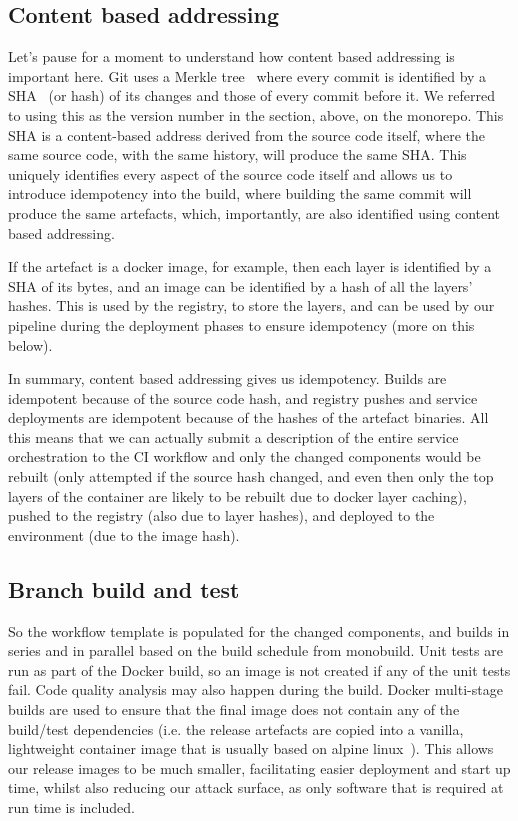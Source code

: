 \documentclass[reprint,amsmath,amssymb,aps]{revtex4-1}
\begin{document}
\subsection{\label{sec:cba}Content based addressing}

Let’s pause for a moment to understand how content based addressing is important here. Git uses a Merkle tree~\cite{Merkletr83:online} where every commit is identified by a SHA~\cite{SecureHa13:online} (or hash) of its changes and those of every commit before it. We referred to using this as the version number in the section, above, on the monorepo. This SHA is a content-based address derived from the source code itself, where the same source code, with the same history, will produce the same SHA. This uniquely identifies every aspect of the source code itself and allows us to introduce idempotency into the build, where building the same commit will produce the same artefacts, which, importantly, are also identified using content based addressing.

If the artefact is a docker image, for example, then each layer is identified by a SHA of its bytes, and an image can be identified by a hash of all the layers’ hashes. This is used by the registry, to store the layers, and can be used by our pipeline during the deployment phases to ensure idempotency (more on this below).

In summary, content based addressing gives us idempotency. Builds are idempotent because of the source code hash, and registry pushes and service deployments are idempotent because of the hashes of the artefact binaries. All this means that we can actually submit a description of the entire service orchestration to the CI workflow and only the changed components would be rebuilt (only attempted if the source hash changed, and even then only the top layers of the container are likely to be rebuilt due to docker layer caching), pushed to the registry (also due to layer hashes), and deployed to the environment (due to the image hash).

\subsection{\label{sec:branchbuild}Branch build and test}

So the workflow template is populated for the changed components, and builds in series and in parallel based on the build schedule from monobuild. Unit tests are run as part of the Docker build, so an image is not created if any of the unit tests fail. Code quality analysis may also happen during the build. Docker multi-stage builds are used to ensure that the final image does not contain any of the build/test dependencies (i.e. the release artefacts are copied into a vanilla, lightweight container image that is usually based on alpine linux~\cite{indexAlp12:online}). This allows our release images to be much smaller, facilitating easier deployment and start up time, whilst also reducing our attack surface, as only software that is required at run time is included.
\end{document}
